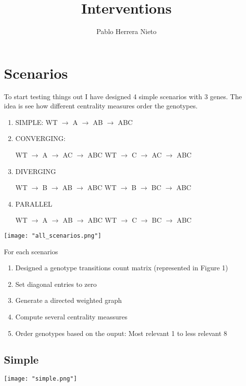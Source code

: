 \documentclass[12pt, a4paper]{article}
\title{Interventions}
\author{Pablo Herrera Nieto}
\begin{document}
\maketitle
\tableofcontents

\section{Scenarios}

To start testing things out I have designed 4 simple scenarios with 3 genes.
The idea is see how different centrality measures order the genotypes.


\begin{enumerate}
  \item SIMPLE: WT $\rightarrow$ A $\rightarrow$ AB $\rightarrow$ ABC 
  \item CONVERGING: 
  
  WT $\rightarrow$ A $\rightarrow$ AC $\rightarrow$ ABC  
  WT $\rightarrow$ C $\rightarrow$ AC $\rightarrow$ ABC  

  \item DIVERGING

  WT $\rightarrow$ B $\rightarrow$ AB $\rightarrow$ ABC  
  WT $\rightarrow$ B $\rightarrow$ BC $\rightarrow$ ABC  

  \item PARALLEL

  WT $\rightarrow$ A $\rightarrow$ AB $\rightarrow$ ABC  
  WT $\rightarrow$ C $\rightarrow$ BC $\rightarrow$ ABC  

  
\end{enumerate}
\texttt{[image: "all\_scenarios.png"]}


For each scenarios
\begin{enumerate}
  \item Designed a genotype transitions count matrix (represented in Figure 1)
  \item Set diagonal entries to zero
  \item Generate a directed weighted graph
  \item Compute several centrality meassures 
  \item Order genotypes based on the ouput: Most relevant 1 to less relevant 8
\end{enumerate}

\pagebreak
\subsection{Simple}
\begin{center}
  \texttt{[image: "simple.png"]}
\end{center}
\end{document}
